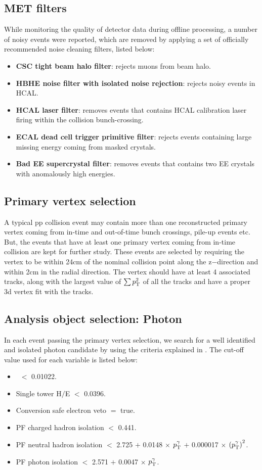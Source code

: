 \subsection{MET filters}
While monitoring the quality of detector data during offline processing, a number of noisy events were reported, which are removed by applying a set
of officially recommended noise cleaning filters, listed below:
\begin{itemize}[leftmargin=*]
\item {\bf{CSC tight beam halo filter}}: rejects muons from beam halo.
\item {\bf{HBHE noise filter with isolated noise rejection}}: rejects noisy events in HCAL.
\item {\bf{HCAL laser filter}}: removes events that contains HCAL calibration laser firing within the collision bunch-crossing.
\item {\bf{ECAL dead cell trigger primitive filter}}: rejects events containing large missing energy coming from masked crystals.
\item {\bf{Bad EE supercrystal filter}}: removes events that contains two EE crystals with anomalously high energies.
\end{itemize}

\subsection{Primary vertex selection}
A typical pp collision event may contain more than one reconstructed primary vertex coming from in-time and out-of-time bunch crossings, pile-up events etc.
But, the events that have at least one primary vertex coming from in-time collision are kept for further study. These events are selected by requiring the
vertex to be within 24\unit{cm} of the nominal collision point along the z$-$direction and within 2\unit{cm} in the radial direction. The vertex should have
at least 4 associated tracks, along with the largest value of $\sum{\pt^{2}}$ of all the tracks and have a proper 3d vertex fit with the tracks. 

\subsection{Analysis object selection: Photon}
In each event passing the primary vertex selection, we search for a well identified and isolated photon candidate by using the criteria explained in
\sectn{\ref{Se:Ph_identi}}. The cut-off value used for each variable is listed below:
\begin{itemize}[leftmargin=*]
\item \sigmaIetaIeta\ $<$ 0.01022.
\item Single tower H$/$E $<$ 0.0396.
\item Conversion safe electron veto $=$ true.
\item PF charged hadron isolation $<$ 0.441.
\item PF neutral hadron isolation $<$ 2.725 $+$ 0.0148 $\times$ $p_{\mathrm T}^{\gamma}$ $+$ 0.000017 $\times$ ${(p_{\mathrm T}^{\gamma})}^{2}$.
\item PF photon isolation $<$ 2.571 $+$ 0.0047 $\times$ $p_{\mathrm T}^{\gamma}$.
\end{itemize}

